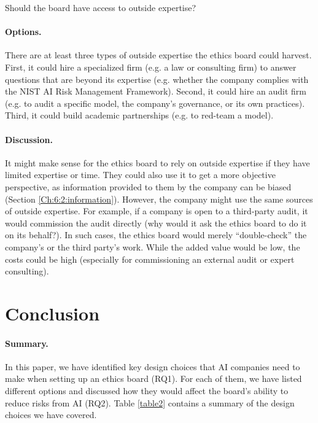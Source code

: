 \documentclass{article}
\begin{document}
Should the board have access to outside expertise?

\paragraph{Options.} There are at least three types of outside expertise the ethics board could harvest. First, it could hire a specialized firm (e.g. a law or consulting firm) to answer questions that are beyond its expertise (e.g. whether the company complies with the NIST AI Risk Management Framework). Second, it could hire an audit firm (e.g. to audit a specific model, the company’s governance, or its own practices). Third, it could build academic partnerships (e.g. to red-team a model).

\paragraph{Discussion.} It might make sense for the ethics board to rely on outside expertise if they have limited expertise or time. They could also use it to get a more objective perspective, as information provided to them by the company can be biased (Section \ref{Ch:6:2:information}). However, the company might use the same sources of outside expertise. For example, if a company is open to a third-party audit, it would commission the audit directly (why would it ask the ethics board to do it on its behalf?). In such cases, the ethics board would merely “double-check” the company’s or the third party’s work. While the added value would be low, the costs could be high (especially for commissioning an external audit or expert consulting).

\section{Conclusion}\label{Ch:7:conclusion}

\paragraph{Summary.} In this paper, we have identified key design choices that AI companies need to make when setting up an ethics board (RQ1). For each of them, we have listed different options and discussed how they would affect the board’s ability to reduce risks from AI (RQ2). Table \ref{table2} contains a summary of the design choices we have covered.
\end{document}
